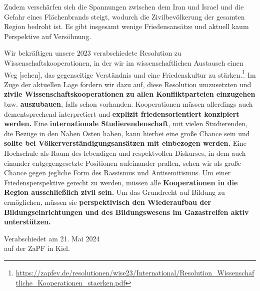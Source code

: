 \documentclass[DIV=calc]{scrartcl}
\let\oldgrqq=\grqq
\def\grqq{\oldgrqq\xspace}
\begin{document}
Zudem verschärfen sich die Spannungen zwischen dem Iran und Israel und die Gefahr eines Flächenbrands steigt, wodurch die Zivilbevölkerung der gesamten Region bedroht ist. Es gibt insgesamt wenige Friedensansätze und aktuell kaum Perspektive auf Versöhnung. 
  
Wir bekräftigen unsere 2023 verabschiedete Resolution zu Wissenschaftskooperationen, in der wir \glqq im wissenschaftlichen Austausch einen Weg [sehen], das gegenseitige Verständnis und eine Friedenskultur zu stärken.\grqq\footnote{\url{https://zapfev.de/resolutionen/wise23/International/Resolution_Wissenschaftliche_Kooperationen_staerken.pdf}} Im Zuge der aktuellen Lage fordern wir dazu auf, diese Resolution umzusetzten und \textbf{zivile Wissenschaftskooperationen zu allen Konfliktparteien einzugehen} bzw. \textbf{auszubauen}, falls schon vorhanden. Kooperationen müssen allerdings auch dementsprechend interpretiert und \textbf{explizit friedensorientiert konzipiert werden.} Eine \textbf{internationale Studierendenschaft}, mit vielen Studierenden, die Bezüge in den Nahen Osten haben, kann hierbei eine große Chance sein und \textbf{sollte bei Völkerverständigungsansätzen mit einbezogen werden.} Eine Hochschule als Raum des lebendigen und respektvollen Diskurses, in dem auch einander entgegengesetzte Positionen aufeinander prallen, sehen wir als große Chance gegen jegliche Form des Rassismus und Antisemitismus. Um einer Friedensperspektive gerecht zu werden, müssen alle \textbf{Kooperationen in die Region ausschließlich zivil sein.} Um das Grundrecht auf Bildung zu ermöglichen, müssen sie \textbf{perspektivisch den Wiederaufbau der Bildungseinrichtungen und des Bildungswesens im Gazastreifen aktiv unterstützen.}


%
\vfill
\begin{flushright}
	Verabschiedet am 21. Mai 2024 \\
	auf der ZaPF in Kiel.
\end{flushright}
\end{document}
